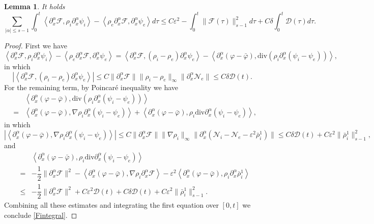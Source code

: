 \documentclass[reqno,twoside,12pt,a4paper]{amsart}
\newcommand{\eps}{\mathbb{\varepsilon}}
\newcommand{\al}{\alpha}
\newcommand{\dive}{\mathrm{div}}
\newcommand{\pa}{\partial}
\newcommand{\D}{\nabla}
\newcommand{\vp}{\varphi}
\newcommand{\calf}{\mathcal{F}}
\newcommand{\Ni}{\mathcal{N}_i}
\newcommand{\Ne}{\mathcal{N}_e}
\newtheorem{lemma}{Lemma}[section]
\numberwithin{equation}{section}
\begin{document}
\begin{lemma}\label{Fpsi}It holds
\begin{equation}\label{Fintegral}
    \sum_{|\al|\leq s-1}\int_{0}^{t}  \left\langle \pa_x^\al \calf, \rho_i \partial^\al_x \psi_i\right\rangle - \left\langle \rho_e\pa_x^\al \calf, \partial^\al_x \psi_e\right\rangle d\tau \leq  C \eps^2 - \int_{0}^{t} \| \calf(\tau)\|_{s-1}^2 d\tau + C\delta \int_{0}^{t} \mathcal{D}(\tau)d\tau.  
\end{equation}
\end{lemma}
\begin{proof}
First we have
\begin{equation*}
    \left\langle \pa_x^\al \calf, \rho_i \partial^\al_x \psi_i\right\rangle - \left\langle \rho_e\pa_x^\al \calf, \partial^\al_x \psi_e\right\rangle= \left<\pa_x^\al \calf, (\rho_i-\rho_e)\pa_x^\al \psi_e\right>-\left<\pa_x^\al(\vp-\bar{\vp}),\dive(\rho_i\pa_x^\al(\psi_i-\psi_e))\right>,
\end{equation*}
in which 
\[
\left|\left<\pa_x^\al \calf, (\rho_i-\rho_e)\pa_x^\al \psi_e\right>\right|\leq C\|\pa_x^\al \calf\|\|\rho_i-\rho_e\|_{\infty}\|\pa_x^\al \Ne\|\leq C\delta\mathcal{D}(t).
\]
For the remaining term, by Poincar\'e inequality we have
\begin{eqnarray}
&&\left<\pa_x^\al(\vp-\bar{\vp}),\dive(\rho_i\pa_x^\al(\psi_i-\psi_e))\right>\nonumber\\
&=&\left<\pa_x^\al(\vp-\bar{\vp}),\D\rho_i\pa_x^\al(\psi_i-\psi_e)\right>+\left<\pa_x^\al(\vp-\bar{\vp}),\rho_i\dive \pa_x^\al(\psi_i-\psi_e)\right>,\nonumber
\end{eqnarray}
in which
\[
\left|\left<\pa_x^\al(\vp-\bar{\vp}),\D\rho_i\pa_x^\al(\psi_i-\psi_e)\right>\right|\leq C\|\pa_x^\al\calf\|\|\D \rho_i\|_\infty\|\pa_x^\al(\Ni-\Ne-\eps^2\bar{\rho}_i^1)\|\leq C\delta\mathcal{D}(t)+C\eps^2\|\bar{\rho}_i^1\|_{s-1}^2,
\]
and
\begin{eqnarray*}
    &&\left<\pa_x^\al(\vp-\bar{\vp}),\rho_i\dive \pa_x^\al(\psi_i-\psi_e)\right>\nonumber\\
   & = & -\dfrac{1}{2}\|\pa_x^\al \calf\|^2 -\left<\pa_x^\al(\vp-\bar{\vp}), \D\rho_i \pa_x^\al\calf \right>- \eps^2\left\langle \partial^\al_x(\varphi-\bar{\varphi}), \rho_i\partial^\al_x \bar{\rho}_i^1\right\rangle\\
    &\leq &  -\dfrac{1}{2}\|\pa_x^\al \calf\|^2 + C\eps^2 \mathcal{D}(t)+C\delta\mathcal{D}(t) + C\eps^2 \|\bar{\rho}_i^1\|_{s-1}^2.
\end{eqnarray*}
Combining all these estimates and integrating the first equation over $[0,t]$ we conclude \eqref{Fintegral}.
\end{proof}
\end{document}
